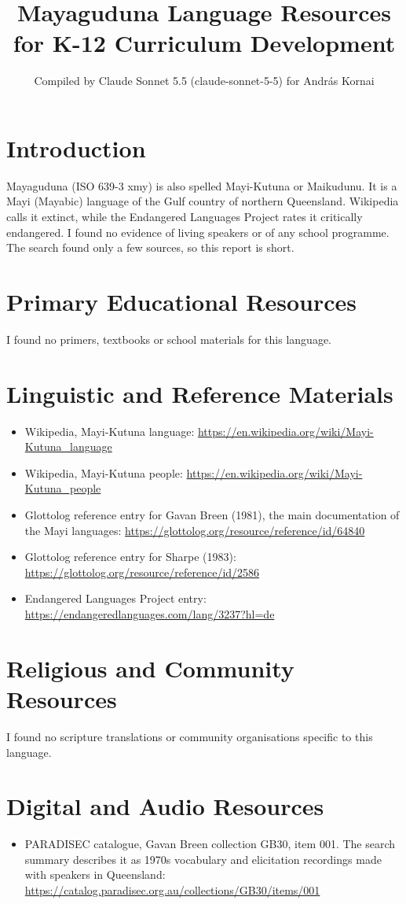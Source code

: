 \documentclass[12pt]{article}
\title{Mayaguduna Language Resources for K-12 Curriculum Development}
\author{Compiled by Claude Sonnet 5.5 (claude-sonnet-5-5) for Andr\'as Kornai}
\date{}
\begin{document}
\maketitle

\section{Introduction}
Mayaguduna (ISO 639-3 xmy) is also spelled Mayi-Kutuna or Maikudunu. It is a Mayi (Mayabic) language of the Gulf country of northern Queensland. Wikipedia calls it extinct, while the Endangered Languages Project rates it critically endangered. I found no evidence of living speakers or of any school programme. The search found only a few sources, so this report is short.

\section{Primary Educational Resources}
I found no primers, textbooks or school materials for this language.

\section{Linguistic and Reference Materials}
\begin{itemize}
\item Wikipedia, Mayi-Kutuna language: \url{https://en.wikipedia.org/wiki/Mayi-Kutuna_language}
\item Wikipedia, Mayi-Kutuna people: \url{https://en.wikipedia.org/wiki/Mayi-Kutuna_people}
\item Glottolog reference entry for Gavan Breen (1981), the main documentation of the Mayi languages: \url{https://glottolog.org/resource/reference/id/64840}
\item Glottolog reference entry for Sharpe (1983): \url{https://glottolog.org/resource/reference/id/2586}
\item Endangered Languages Project entry: \url{https://endangeredlanguages.com/lang/3237?hl=de}
\end{itemize}

\section{Religious and Community Resources}
I found no scripture translations or community organisations specific to this language.

\section{Digital and Audio Resources}
\begin{itemize}
\item PARADISEC catalogue, Gavan Breen collection GB30, item 001. The search summary describes it as 1970s vocabulary and elicitation recordings made with speakers in Queensland: \url{https://catalog.paradisec.org.au/collections/GB30/items/001}
\end{itemize}
\end{document}
